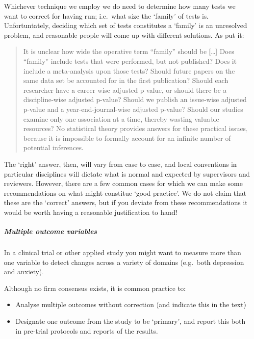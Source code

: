 \documentclass[]{article}
\providecommand{\tightlist}{%
  \setlength{\itemsep}{0pt}\setlength{\parskip}{0pt}}
\let\oldsubparagraph\subparagraph
\renewcommand{\subparagraph}[1]{\oldsubparagraph{#1}\mbox{}}
\begin{document}
Whichever technique we employ we do need to determine how many tests we want to
correct for having run; i.e.~what size the `family' of tests is. Unfortuntately,
deciding which set of tests constitutes a `family' is an unresolved problem, and
reasonable people will come up with different solutions. As \citet{feise2002multiple}
put it:

\begin{quote}
It is unclear how wide the operative term ``family'' should be {[}\ldots{}{]} Does
``family'' include tests that were performed, but not published? Does it include
a meta-analysis upon those tests? Should future papers on the same data set be
accounted for in the first publication? Should each researcher have a
career-wise adjusted p-value, or should there be a discipline-wise adjusted
p-value? Should we publish an issue-wise adjusted p-value and a
year-end-journal-wise adjusted p-value? Should our studies examine only one
association at a time, thereby wasting valuable resources? No statistical
theory provides answers for these practical issues, because it is impossible
to formally account for an infinite number of potential inferences.
\end{quote}

The `right' answer, then, will vary from case to case, and local conventions in
particular disciplines will dictate what is normal and expected by supervisors
and reviewers. However, there are a few common cases for which we can make some
recommendations on what might constitue `good practice'. We do not claim that
these are the `correct' answers, but if you deviate from these recommendations
it would be worth having a reasonable justification to hand!

\hypertarget{multiple-outcome-variables}{%
\subparagraph{Multiple outcome variables}\label{multiple-outcome-variables}}

In a clinical trial or other applied study you might want to measure more than
one variable to detect changes across a variety of domains (e.g.~both depression
and anxiety).

Although no firm consensus exists, it is common practice to:

\begin{itemize}
\tightlist
\item
  Analyse multiple outcomes without correction (and indicate this in the text)
\item
  Designate one outcome from the study to be `primary', and report this both
  in pre-trial protocols and reports of the results.
\end{itemize}
\end{document}
